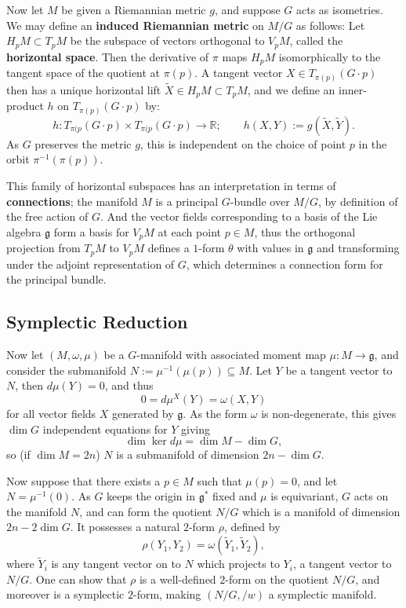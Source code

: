 \documentclass{article}
\newcommand{\ra}{\rightarrow}
\newcommand{\lra}{\longrightarrow}
\newcommand{\w}{\omega}
\newcommand{\RR}{\mathbb{R}}
\newcommand{\mfg}{\mathfrak{g}}
\begin{document}
	Now let $M$ be given a Riemannian metric $g$, and suppose $G$ acts as isometries. We may define an \textbf{induced Riemannian metric} on $M/G$ as follows: Let $H_{p}M \subset T_{p}M$ be the subspace of vectors orthogonal to $V_{p}M$, called the \textbf{horizontal space}. Then the derivative of $\pi$ maps $H_{p}M$ isomorphically to the tangent space of the quotient at $\pi(p)$. A tangent vector $X \in T_{\pi(p)}(G \cdot p)$ then has a unique horizontal lift $\tilde{X} \in H_{p}M \subset T_{p}M$, and we define an inner-product $h$ on $T_{\pi(p)}( G \cdot p)$ by:
	\[
		h : T_{\pi(p}(G \cdot p) \times T_{\pi(p}(G \cdot p) \lra \RR; \qquad h(X,Y) := g(\tilde{X}, \tilde{Y}).
	\]
	As $G$ preserves the metric $g$, this is independent on the choice of point $p$ in the orbit $\pi^{-1}\left(\pi(p)\right)$.
	
	This family of horizontal subspaces has an interpretation in terms of \textbf{connections}; the manifold $M$ is a principal $G$-bundle over $M/G$, by definition of the free action of $G$. And the vector fields corresponding to a basis of the Lie algebra $\mfg$ form a basis for $V_{p}M$ at each point $p \in M$, thus the orthogonal projection from $T_{p}M$ to $V_{p}M$ defines a $1$-form $\theta$ with values in $\mfg$ and transforming under the adjoint representation of $G$, which determines a connection form for the principal bundle.
	
	\subsection{Symplectic Reduction}
	
	Now let $(M, \w, \mu)$ be a $G$-manifold with associated moment map $\mu : M \ra \mfg$, and consider the submanifold $N := \mu^{-1}(\mu(p)) \subseteq M$. Let $Y$ be a tangent vector to $N$, then $d\mu(Y) = 0$, and thus
	\[
		0 = d\mu^{X}(Y) = \w(X,Y)
	\]
	for all vector fields $X$ generated by $\mfg$. As the form $\w$ is non-degenerate, this gives $\dim G$ independent equations for $Y$ giving
	\[
		\dim \ker d\mu = \dim M - \dim G,
	\]
	so (if $\dim M = 2n$) $N$ is a submanifold of dimension $2n - \dim G$.
	
	Now suppose that there exists a $p \in M$ such that $\mu(p) = 0$, and let $N = \mu^{-1}(0)$. As $G$ keeps the origin in $\mfg^{\ast}$ fixed and $\mu$ is equivariant, $G$ acts on the manifold $N$, and can form the quotient $N/G$ which is a manifold of dimension $2n - 2\dim G$. It possesses a natural $2$-form $\rho$, defined by
	\[
		\rho(Y_{1}, Y_{2}) = \w(\tilde{Y}_{1}, \tilde{Y}_{2}),
	\]
	where $\tilde{Y}_{i}$ is any tangent vector on to $N$ which projects to $Y_{i}$, a tangent vector to $N/G$. One can show that $\rho$ is a well-defined $2$-form on the quotient $N/G$, and moreover is a symplectic $2$-form, making $(N/G, /w)$ a symplectic manifold.
	
\end{document}
